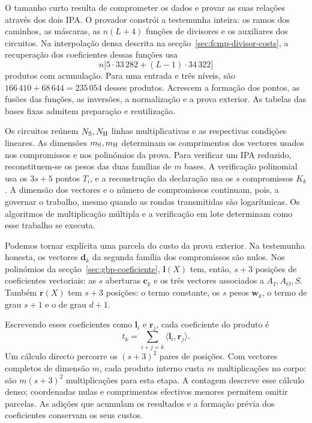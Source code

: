 
O tamanho curto resulta de comprometer os dados e provar
as suas relações através dos dois IPA. O provador constrói
a testemunha inteira: os ramos dos caminhos, as máscaras,
as \(n(L+4)\) funções de divisores e os auxiliares dos
circuitos. Na interpolação densa descrita na
secção~\ref{sec:fcmp-divisor-costs}, a recuperação dos
coeficientes dessas funções usa
\[
 n\bigl[5\cdot33\,282+(L-1)\cdot34\,322\bigr]
\]
produtos com acumulação. Para uma entrada e três níveis,
são \(166\,410+68\,644=235\,054\) desses produtos.
Acrescem a formação dos pontos, as fusões das funções,
as inversões, a normalização e a prova exterior.
As tabelas das bases fixas admitem preparação e reutilização.

Os circuitos reúnem \(N_{\rm S},N_{\rm H}\) linhas
multiplicativas e as respectivas condições lineares.
As dimensões \(m_{\rm S},m_{\rm H}\) determinam os
comprimentos dos vectores usados nos compromissos e nos
polinómios da prova. Para verificar um IPA reduzido,
reconstituem-se os pesos das duas famílias de \(m\)
bases. A verificação polinomial usa os \(3s+5\) pontos
\(T_i\), e a reconstrução da declaração usa os \(s\)
compromissos \(K_k\). A dimensão dos vectores e o número
de compromissos continuam, pois, a governar o trabalho,
mesmo quando as rondas transmitidas são logarítmicas.
Os algoritmos de multiplicação múltipla e a verificação
em lote determinam como esse trabalho se executa.

Podemos tornar explícita uma parcela do custo da prova
exterior. Na testemunha honesta, os vectores
\(\boldsymbol d_k\) da segunda família dos compromissos
são nulos. Nos polinómios da secção~\ref{sec:gbp-coeficiente},
\(\boldsymbol l(X)\) tem, então, \(s+3\) posições de
coeficientes vectoriais: as \(s\) aberturas
\(\boldsymbol c_k\) e os três vectores associados a
\(A_I,A_O,S\). Também \(\boldsymbol r(X)\) tem \(s+3\)
posições: o termo constante, os \(s\) pesos
\(\boldsymbol w_k\), o termo de grau \(s+1\) e o de
grau \(d+1\).

Escrevendo esses coeficientes como \(\boldsymbol l_i\)
e \(\boldsymbol r_j\), cada coeficiente do produto é
\[
 t_k=\sum_{i+j=k}
          \langle\boldsymbol l_i,\boldsymbol r_j\rangle.
\]
Um cálculo directo percorre os \((s+3)^2\) pares de
posições. Com vectores completos de dimensão \(m\),
cada produto interno custa \(m\) multiplicações no corpo:
são \(m(s+3)^2\) multiplicações para esta etapa.
A contagem descreve esse cálculo denso; coordenadas
nulas e comprimentos efectivos menores permitem omitir
parcelas. As adições que acumulam os resultados e a
formação prévia dos coeficientes conservam os seus custos.


